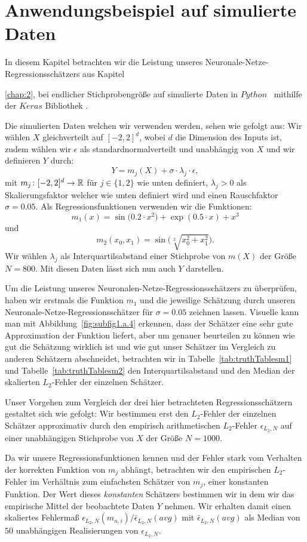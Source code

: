 \chapter{Anwendungsbeispiel auf simulierte Daten}
\label{chap:4}

In diesem Kapitel betrachten wir die Leistung unseres Neuronale-Netze-Regressionsschätzers aus Kapitel~{\ref{chap:2}, bei endlicher Stichprobengröße auf simulierte Daten in $Python$~\cite[Version 3.7.3]{van1995python} mithilfe der $Keras$ Bibliothek \cite{chollet2015keras}.

Die simulierten Daten welchen wir verwenden werden, sehen wie gefolgt aus:
Wir wählen $X$ gleichverteilt auf $[-2, 2]^d$, wobei $d$ die Dimension des Inputs ist, zudem wählen wir $\epsilon$ als standardnormalverteilt und unabhängig von $X$ und wir definieren $Y$ durch:
$$Y = m_j(X) + \sigma \cdot \lambda_j \cdot \epsilon,$$ 
mit $m_j \colon [-2, 2]^d \to \mathbb{R}$ für  $j \in \{1, 2\}$ wie unten definiert, $\lambda_j > 0$ als Skalierungsfaktor welcher wie unten definiert wird und einen Rauschfaktor $\sigma = 0.05.$ Als Regressionsfunktionen verwenden wir die Funktionen:
$$ m_1(x) =  \sin\big(0.2 \cdot x^2\big) + \exp(0.5 \cdot x) + x^3$$
und
$$ m_2(x_0, x_1) = \sin\big(\sqrt[2]{x_0^2 + x_1^2}\big).$$
Wir wählen $\lambda_j$ als Interquartilsabstand einer Stichprobe von $m(X)$ der Größe $N = 800$. Mit diesen Daten lässt sich nun auch $Y$ darstellen.

Um die Leistung unseres Neuronalen-Netze-Regressionsschätzers zu überprüfen, haben wir erstmals die Funktion $m_1$ und die jeweilige Schätzung durch unseren Neuronale-Netze-Regressionsschätzer für $\sigma = 0.05$ zeichnen lassen. 
Visuelle kann man mit Abbildung~\ref{fig:subfig1.a.4} erkennen, dass der Schätzer eine sehr gute Approximation der Funktion liefert, aber um genauer beurteilen zu können wie gut die Schätzung wirklich ist und wie gut unser Schätzer im Vergleich zu anderen Schätzern abschneidet, betrachten wir in Tabelle~\ref{tab:truthTablesm1} und Tabelle~\ref{tab:truthTablesm2} den Interquartilsabstand und den Median der skalierten $L_2$-Fehler der einzelnen Schätzer. 

Unser Vorgehen zum Vergleich der drei hier betrachteten Regressionsschätzern gestaltet sich wie gefolgt:
Wir bestimmen erst den $L_2$-Fehler der einzelnen Schätzer approximativ durch den empirisch arithmetischen $L_2$-Fehler $\epsilon_{L_2,N}$ auf einer unabhängigen Stichprobe von $X$ der Größe $N = 1000$. 

Da wir unsere Regressionsfunktionen kennen und der Fehler stark vom Verhalten der korrekten Funktion von $m_j$ abhängt, betrachten wir den empirischen $L_2$-Fehler im Verhältnis zum einfachsten Schätzer von $m_j$, einer konstanten Funktion. Der Wert dieses \textit{konstanten} Schätzers bestimmen wir in dem wir das empirische Mittel der beobachtete Daten $Y$ nehmen. Wir erhalten damit einen skaliertes Fehlermaß $\epsilon_{L_2,N}(m_{n,i})/\bar{\epsilon}_{L_2,N}(avg)$ mit $\bar{\epsilon}_{L_2,N}(avg)$ als Median von $50$ unabhängigen Realisierungen von $\epsilon_{L_2,N}$. 

}
